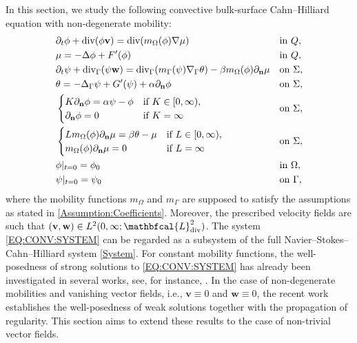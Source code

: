 \documentclass[10pt,reqno]{amsart}
\theoremstyle{remark}
\numberwithin{equation}{section}
\newcommand{\n}{\mathbf{n}}
\newcommand{\bv}{\mathbf{v}}
\newcommand{\bw}{\mathbf{w}}
\newcommand{\delt}{\partial_{t}}
\newcommand{\deln}{\partial_\n}
\newcommand{\Grad}{\nabla}
\newcommand{\Lap}{\Delta}
\newcommand{\Div}{\textnormal{div}}
\newcommand{\Gradg}{\nabla_\Ga}
\newcommand{\Lapg}{\Delta_\Ga}
\newcommand{\Divg}{\textnormal{div}_\Ga}
\newcommand{\Om}{\Omega}
\newcommand{\Ga}{\Gamma}
\begin{document}
In this section, we study the following convective bulk-surface Cahn--Hilliard equation with non-degenerate mobility:
\begin{subequations}\label{EQ:CONV:SYSTEM}
    \begin{align}
        \label{EQ:CONV:SYSTEM:1}
        &\delt\phi + \Div(\phi\mathbf{v}) = \Div(m_\Om(\phi)\Grad\mu) && \text{in} \ Q, \\
        \label{EQ:CONV:SYSTEM:2}
        &\mu = -\Lap\phi + F'(\phi)   && \text{in} \ Q, \\
        \label{EQ:CONV:SYSTEM:3}
        &\delt\psi + \Divg(\psi\mathbf{w}) = \Divg(m_\Ga(\psi)\Gradg\theta) - \beta m_\Om(\phi)\deln\mu && \text{on} \ \Sigma, \\
        \label{EQ:CONV:SYSTEM:4}
        &\theta = - \Lapg\psi + G'(\psi) + \alpha\deln\phi && \text{on} \ \Sigma, \\
        \label{EQ:CONV:SYSTEM:5}
        &\begin{cases} K\deln\phi = \alpha\psi - \phi &\text{if} \ K\in [0,\infty), \\
        \deln\phi = 0 &\text{if} \ K = \infty
        \end{cases} && \text{on} \ \Sigma, \\
        \label{EQ:CONV:SYSTEM:6}
        &\begin{cases} 
        L m_\Om(\phi)\deln\mu = \beta\theta - \mu &\text{if} \  L\in[0,\infty), \\
        m_\Om(\phi)\deln\mu = 0 &\text{if} \ L=\infty
        \end{cases} &&\text{on} \ \Sigma, \\
        \label{EQ:CONV:SYSTEM:7}
        &\phi\vert_{t=0} = \phi_0 &&\text{in} \ \Om, \\
        \label{EQ:CONV:SYSTEM:8}
        &\psi\vert_{t=0} = \psi_0 &&\text{on} \ \Ga,
    \end{align}
\end{subequations}
where the mobility functions $m_\Om$ and $m_\Ga$ are supposed to satisfy the assumptions as stated in \ref{Assumption:Coefficients}. Moreover, the prescribed velocity fields are such that $(\mathbf{v},\mathbf{w})\in L^2(0,\infty;\mathbfcal{L}^2_\Div)$. The system \eqref{EQ:CONV:SYSTEM} can be regarded as a subsystem of the full Navier--Stokes--Cahn--Hilliard system \eqref{System}. For constant mobility functions, the well-posedness of strong solutions to \eqref{EQ:CONV:SYSTEM} has already been investigated in several works, see, for instance, \cite{Knopf2024, Knopf2025, Giorgini2025}. In the case of non-degenerate mobilities and vanishing vector fields, i.e., $\bv \equiv 0$ and $\bw \equiv 0$, the recent work \cite{Stange2025} establishes the well-posedness of weak solutions together with the propagation of regularity. This section aims to extend these results to the case of non-trivial vector fields. 
\end{document}
